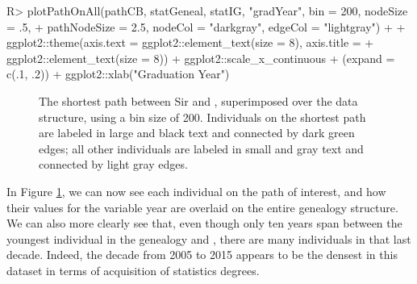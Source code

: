 \documentclass[article,shortnames]{jss}
\begin{document}
\begin{CodeChunk}
\begin{CodeInput}
R> plotPathOnAll(pathCB, statGeneal, statIG, "gradYear", bin = 200, nodeSize = .5,
+    pathNodeSize = 2.5, nodeCol = "darkgray", edgeCol = "lightgray") +
+    ggplot2::theme(axis.text = ggplot2::element_text(size = 8), axis.title =
+    ggplot2::element_text(size = 8)) + ggplot2::scale_x_continuous
+    (expand = c(.1, .2)) + ggplot2::xlab("Graduation Year")
\end{CodeInput}
\end{CodeChunk}

\begin{figure}[H]
    \centering
    \caption{The shortest path between Sir  and , superimposed over the data structure, using a bin size of 200. Individuals on the shortest path are labeled in large and black text and connected by dark green edges; all other individuals are labeled in small and gray text and connected by light gray edges.}
    \label{fig:plotCBNoText}
\end{figure}

In Figure \ref{fig:plotCBNoText}, we can now see each individual on the path of interest, and how their values for the variable year are overlaid on the entire genealogy structure. We can also more clearly see that, even though only ten years span between the youngest individual in the genealogy and , there are many individuals in that last decade. Indeed, the decade from 2005 to 2015 appears to be the densest in this dataset in terms of acquisition of statistics degrees.
\end{document}
